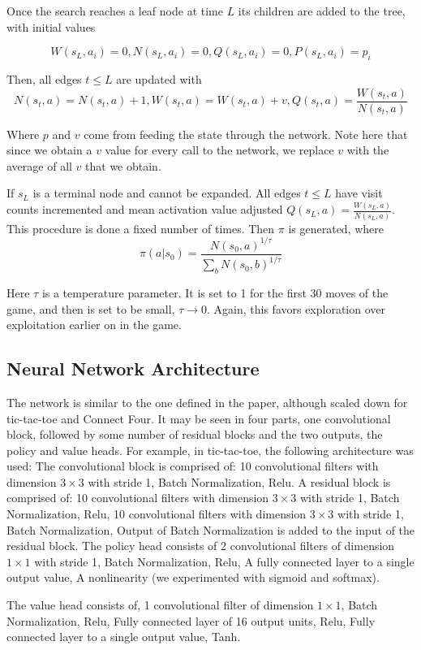 \documentclass[english]{article}
\begin{document}
Once the search reaches a
leaf node at time $L$ its children are added to the tree, with initial values

$$W(s_L, a_i) = 0, N(s_L, a_i) = 0, Q(s_L, a_i) = 0, P(s_L, a_i) = p_i$$

Then, all edges $t \leq L$ are updated with
$$N(s_t,a)=N(s_t,a)+1,W(s_t,a)=W(s_t,a)+v, Q(s_t,a)=\frac{W(s_t,a)}{N(s_t,a)}$$

Where $p$ and $v$ come from feeding the state through the network. Note here
that since we obtain a $v$ value for every call to the network, we replace $v$
with the average of all $v$ that we obtain.

If $s_L$ is a terminal node and cannot be expanded. All edges $t\leq L$ have
visit counts incremented and mean activation value adjusted
$Q(s_L,a)=\frac{W(s_L,a)}{N(s_L,a)}$. This procedure is done a fixed number of
times. Then $\pi$ is generated, where
$$\pi(a|s_0) = \frac{N(s_0,a)^{1/\tau}}{\sum_b N(s_0,b)^{1/\tau}}$$

Here $\tau$ is a temperature parameter. It is set to 1 for the first 30 moves of
the game, and then is set to be small, $\tau \rightarrow 0$. Again, this favors
exploration over exploitation earlier on in the game.


\subsection{Neural Network Architecture}
The network is similar to the one defined in the paper, although scaled down for
tic-tac-toe and Connect Four. It may be seen in four parts, one convolutional
block, followed by some number of residual blocks \cite{Residual} and the two outputs,
the policy and value heads.
For example, in tic-tac-toe, the following architecture was used:
The convolutional block is comprised of: 10 convolutional filters with dimension
$3 \times 3$ with stride 1, Batch Normalization, Relu.
A residual block is comprised of: 10 convolutional filters with dimension
$3 \times 3$ with stride 1, Batch Normalization, Relu, 10 convolutional filters
with dimension $3 \times 3$ with stride 1, Batch Normalization, Output of Batch
Normalization is added to the input of the residual block.
The policy head consists of 2 convolutional filters of dimension $1 \times 1$
with stride 1, Batch Normalization, Relu, A fully connected layer to a single
output value, A nonlinearity (we experimented with sigmoid and softmax).

The value head consists of, 1 convolutional filter of dimension $1 \times 1$,
Batch Normalization, Relu, Fully connected layer of 16 output units, Relu,
Fully connected layer to a single output value, Tanh.
\end{document}
